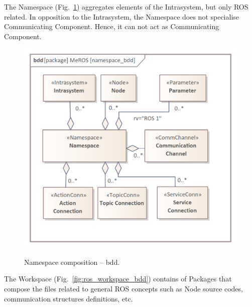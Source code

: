\documentclass{ieeeaccess}
\begin{document}
	
	The Namespace (Fig.~\ref{fig:namespace_bdd}) aggregates elements of the Intrasystem, but only ROS related. In opposition to the Intrasystem, the Namespace does not specialise Communicating Component. Hence, it can not act as Communicating Component.
	
	\begin{figure}[htb]
		\centering
		\begin{center}
			{\includegraphics[scale=0.75]{img/meros_pkg/namespace_bdd.png}}
		\end{center}
		\caption{Namespace composition -- bdd.} 
		\label{fig:namespace_bdd}
	\end{figure}
	
	The Workspace (Fig.~\ref{fig:ros_workspace_bdd}) contains of Packages that compose the files related to general ROS concepts such as Node source codes, communication structures definitions, etc. 
	
\end{document}
